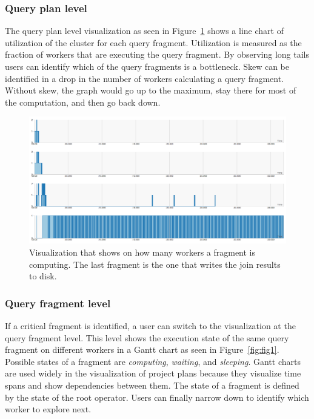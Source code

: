 \documentclass[11pt]{scrartcl}
\begin{document}
\subsubsection{Query plan level}

The query plan level visualization as seen in Figure~\ref{fig:frags} shows a line chart of utilization of the cluster for each query fragment. Utilization is measured as the fraction of workers that are executing the query fragment. By observing long tails users can identify which of the query fragments is a bottleneck. Skew can be identified in a drop in the number of workers calculating a query fragment. Without skew, the graph would go up to the maximum, stay there for most of the computation, and then go back down.

\begin{figure}[h]
  \begin{center}
    \includegraphics[width=\textwidth]{fragments_lines}
  \end{center}
  \caption{Visualization that shows on how many workers a fragment is computing. The last fragment is the one that writes the join results to disk.}
  \label{fig:frags}
\end{figure}


\subsubsection{Query fragment level}

If a critical fragment is identified, a user can switch to the visualization at the query fragment level. This level shows the execution state of the same query fragment on different workers in a Gantt chart as seen in Figure~\ref{fig:fig1}. Possible states of a fragment are \emph{computing}, \emph{waiting}, and \emph{sleeping}. Gantt charts are used widely in the visualization of project plans because they visualize time spans and show dependencies between them. The state of a fragment is defined by the state of the root operator. Users can finally narrow down to identify which worker to explore next.
\end{document}
